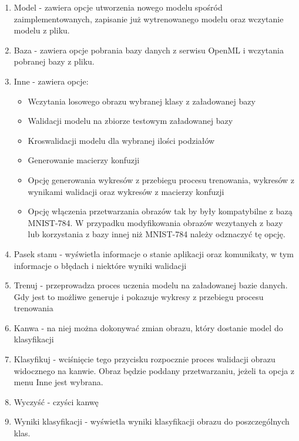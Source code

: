 \documentclass{article}
\begin{document}
\begin{enumerate}
    \item Model - zawiera opcje utworzenia
     nowego modelu spośród zaimplementowanych,
     zapisanie już wytrenowanego modelu oraz wczytanie 
     modelu z pliku.
    \item Baza - zawiera opcje pobrania bazy danych
     z serwisu OpenML i wczytania pobranej bazy z pliku.
    
    \item Inne - zawiera opcje:
        \begin{itemize}
            \item Wczytania losowego obrazu wybranej klasy z załadowanej bazy
            \item Walidacji modelu na zbiorze testowym załadowanej bazy
            \item Kroswalidacji modelu dla wybranej ilości podziałów
            \item Generowanie macierzy konfuzji
            \item Opcję generowania wykresów z przebiegu procesu trenowania, wykresów z wynikami walidacji oraz wykresów z macierzy konfuzji
            \item Opcję włączenia przetwarzania obrazów tak by były kompatybilne z bazą MNIST-784. W przypadku modyfikowania obrazów wczytanych z bazy lub korzystania z bazy innej niż MNIST-784 należy odznaczyć tę opcję.
        \end{itemize}

    \item Pasek stanu - wyświetla informacje o stanie aplikacji oraz komunikaty, w tym informacje o błędach i niektóre wyniki walidacji
    \item Trenuj - przeprowadza proces uczenia modelu na załadowanej bazie danych. Gdy jest to możliwe generuje i pokazuje wykresy z przebiegu procesu trenowania
    \item Kanwa - na niej można dokonywać zmian obrazu, który dostanie model do klasyfikacji
    \item Klasyfikuj - wciśnięcie tego przycisku rozpocznie proces walidacji obrazu widocznego na kanwie. Obraz będzie poddany przetwarzaniu, jeżeli ta opcja z menu Inne jest wybrana.
    \item Wyczyść - czyści kanwę
    \item Wyniki klasyfikacji - wyświetla wyniki klasyfikacji obrazu do poszczególnych klas.
\end{enumerate}
\end{document}
